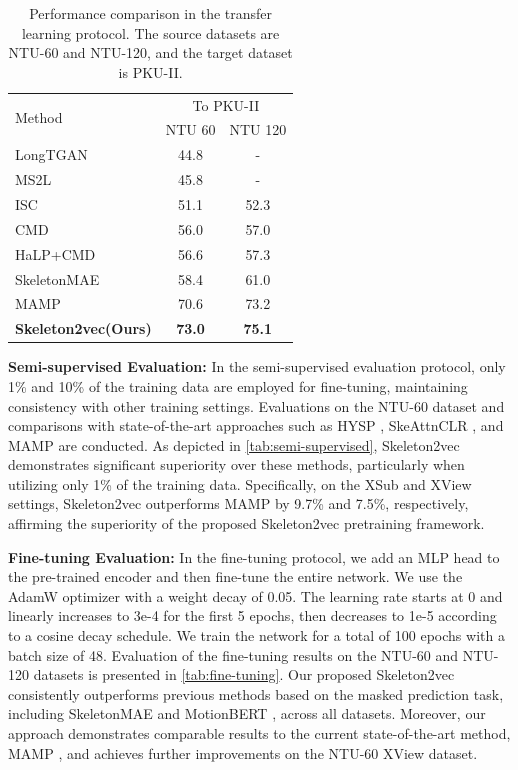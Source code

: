 \begin{table}[tb]
    \centering
    \begin{tabular}{l c c}
      \toprule
      \multirow{2}{*}{Method} &
      \multicolumn{2}{c}{To PKU-II} \\
      & NTU 60 & NTU 120 \\
      \midrule
      LongTGAN \cite{zheng2018unsupervised} & 44.8 & - \\
      MS2L \cite{lin2020ms2l} & 45.8 & - \\
      ISC \cite{thoker2021skeleton} & 51.1 & 52.3 \\
      CMD \cite{mao2022cmd} & 56.0 & 57.0 \\
      HaLP+CMD \cite{shah2023halp} & 56.6 & 57.3 \\
      SkeletonMAE \cite{wu2023skeletonmae} & 58.4 & 61.0 \\
      MAMP \cite{mao2023masked} & 70.6 & 73.2 \\
      \midrule
      \textbf{Skeleton2vec(Ours)} & \textbf{73.0} & \textbf{75.1} \\
      \bottomrule
    \end{tabular}
    \caption{
      Performance comparison in the transfer learning protocol.
      The source datasets are NTU-60 and NTU-120, and the target dataset is PKU-II.
    }
    \label{tab:transer}
\end{table}

\noindent \textbf{Semi-supervised Evaluation:}
In the semi-supervised evaluation protocol, only 1\% and 10\% of the training
data are employed for fine-tuning, maintaining consistency with other training settings.
Evaluations on the NTU-60 dataset and comparisons with state-of-the-art approaches
such as HYSP \cite{franco2023hyperbolic}, SkeAttnCLR \cite{Hua2023SkeAttnCLR}, and MAMP
\cite{mao2023masked} are conducted.
As depicted in \cref{tab:semi-supervised},
Skeleton2vec demonstrates significant superiority over these methods, particularly
when utilizing only 1\% of the training data. Specifically, on the XSub and XView
settings, Skeleton2vec outperforms MAMP by 9.7\% and 7.5\%, respectively,
affirming the superiority of the proposed Skeleton2vec pretraining framework.

\noindent \textbf{Fine-tuning Evaluation:}
In the fine-tuning protocol, we add an MLP head to the pre-trained
encoder and then fine-tune the entire network. We use the AdamW optimizer with a
weight decay of 0.05. The learning rate starts at 0 and linearly increases to 3e-4
for the first 5 epochs, then decreases to 1e-5 according to a cosine decay schedule.
We train the network for a total of 100 epochs with a batch size of 48.
Evaluation of the fine-tuning results on the NTU-60 and NTU-120 datasets is
presented in \cref{tab:fine-tuning}. Our proposed Skeleton2vec consistently outperforms
previous methods based on the masked prediction task, including SkeletonMAE \cite{yan2023skeletonmae}
and MotionBERT \cite{zhu2023motionbert}, across all datasets. Moreover, our
approach demonstrates comparable results to the current state-of-the-art method,
MAMP \cite{mao2023masked}, and achieves further improvements on the NTU-60 XView dataset.

